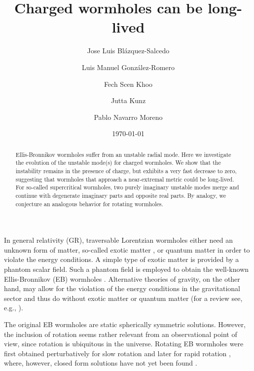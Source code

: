 \documentclass[floats,floatfix,showpacs,amssymb,prd,superscriptaddress,nofootinbib,nolongbibliography,reprint]{revtex4-2}
\newcommand\prlsec[1]{\vspace{2mm}\noindent {\textbf{  \textit{#1}}}}
\begin{document}
\title{{Charged wormholes can be long-lived}}

\author{Jose Luis Bl\'azquez-Salcedo} 
\author{Luis Manuel Gonz\'alez-Romero} 
\author{{Fech Scen Khoo}}
\author{{Jutta Kunz}}
\author{{Pablo Navarro Moreno}}

\date{\today}


\begin{abstract}

Ellis-Bronnikov wormholes suffer from an unstable radial mode.
Here we investigate the evolution of the unstable mode(s) for charged wormholes.
We show that the instability remains in the presence of charge, but exhibits a very fast decrease to zero,
suggesting
that wormholes that approach a near-extremal metric could be 
long-lived.
For so-called supercritical wormholes, two purely imaginary unstable modes merge and continue with degenerate imaginary parts and opposite real parts.
By analogy, we conjecture an analogous behavior for rotating wormholes.
\end{abstract}

\maketitle


\prlsec{Introduction.}
In general relativity (GR), traversable Lorentzian wormholes either need an unknown form of matter, so-called exotic matter \cite{Morris:1988cz}, or quantum matter \cite{Blazquez-Salcedo:2020czn,Konoplya:2021hsm,Blazquez-Salcedo:2021udn} in order to violate the energy conditions.
A simple type of exotic matter is provided by a phantom scalar field.
Such a phantom field is employed to obtain the well-known Ellis-Bronnikov (EB) wormholes \cite{Ellis:1973yv,Bronnikov:1973fh}.
Alternative theories of gravity, on the other hand, may allow for the violation of the energy conditions in the gravitational sector and thus do without exotic matter or quantum matter \cite{Kanti:2011jz} (for a review see, e.g., \cite{Lobo:2017cay}).

The original EB wormholes are static spherically symmetric solutions.
However, the inclusion of rotation seems rather relevant from an observational point of view, since rotation is ubiquitous in the universe.
Rotating EB wormholes were first obtained perturbatively for slow rotation \cite{Kashargin:2007mm,Kashargin:2008pk} and later for rapid rotation \cite{Kleihaus:2014dla,Chew:2016epf},
where, however, closed form solutions have not yet been found \cite{Volkov:2021blw}.
\end{document}
